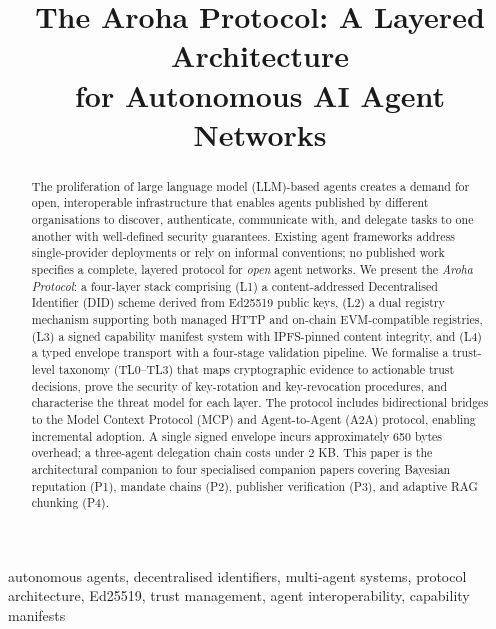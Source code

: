 \documentclass[conference]{IEEEtran}
\begin{document}
\title{The Aroha Protocol: A Layered Architecture\\
       for Autonomous AI Agent Networks}

\author{
}

\maketitle

\begin{abstract}
The proliferation of large language model (LLM)-based agents
creates a demand for open, interoperable infrastructure that
enables agents published by different organisations to discover,
authenticate, communicate with, and delegate tasks to one another
with well-defined security guarantees. Existing agent frameworks
address single-provider deployments or rely on informal
conventions; no published work specifies a complete, layered
protocol for \emph{open} agent networks.
We present the \textit{Aroha Protocol}: a four-layer stack
comprising (L1) a content-addressed Decentralised Identifier
(DID) scheme derived from Ed25519 public keys, (L2) a dual
registry mechanism supporting both managed HTTP and on-chain
EVM-compatible registries, (L3) a signed capability manifest
system with IPFS-pinned content integrity, and (L4) a typed
envelope transport with a four-stage validation pipeline.
We formalise a trust-level taxonomy (TL0--TL3) that maps
cryptographic evidence to actionable trust decisions, prove the
security of key-rotation and key-revocation procedures, and
characterise the threat model for each layer. The protocol
includes bidirectional bridges to the Model Context Protocol
(MCP) and Agent-to-Agent (A2A) protocol, enabling incremental
adoption. A single signed envelope incurs approximately 650
bytes overhead; a three-agent delegation chain costs under 2 KB.
This paper is the architectural companion to four specialised
companion papers covering Bayesian reputation (P1), mandate
chains (P2), publisher verification (P3), and adaptive RAG
chunking (P4).
\end{abstract}

\begin{IEEEkeywords}
autonomous agents, decentralised identifiers, multi-agent
systems, protocol architecture, Ed25519, trust management,
agent interoperability, capability manifests
\end{IEEEkeywords}
\end{document}
